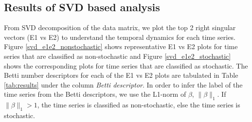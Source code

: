 \documentclass[10pt,conference]{IEEEtran}
\begin{document}
\subsection{Results of SVD based analysis}



From SVD decomposition of the data matrix, we plot the top 2 right singular vectors (E1 vs E2) to understand the temporal dynamics for each time series. Figure \ref{svd_e1e2_nonstochastic} shows representative E1 vs E2 plots for time series  that are classified as non-stochastic and Figure \ref{svd_e1e2_stochastic}  shows the corresponding plots for time series that are classified as stochastic. The Betti number descriptors for each of the E1 vs E2 plots are tabulated in Table \ref{tab:results} under the column \textit{Betti descriptor}. In order to infer the label of the time series from the Betti descriptors, we use the L1-norm of $\beta$, $\|\beta\|_1$. If $\|\beta\|_1 > 1$, the time series is classified as non-stochastic, else the time series is stochastic.

\end{document}
